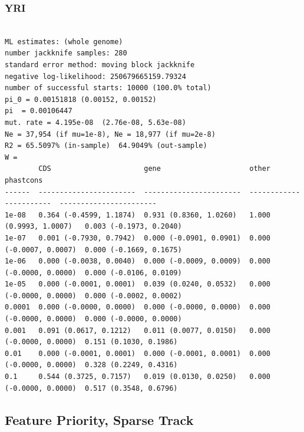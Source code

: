 \documentclass[11pt]{article}
\begin{document}
\subsubsection*{YRI}
\begin{minipage}{\linewidth}\begin{footnotesize}
\begin{verbatim}

ML estimates: (whole genome)
number jackknife samples: 280
standard error method: moving block jackknife
negative log-likelihood: 250679665159.79324
number of successful starts: 10000 (100.0% total)
pi_0 = 0.00151818 (0.00152, 0.00152)
pi  = 0.00106447
mut. rate = 4.195e-08  (2.76e-08, 5.63e-08)
Ne = 37,954 (if mu=1e-8), Ne = 18,977 (if mu=2e-8)
R2 = 65.5097% (in-sample)  64.9049% (out-sample)
W = 
        CDS                      gene                     other                    phastcons
------  -----------------------  -----------------------  -----------------------  -----------------------
1e-08   0.364 (-0.4599, 1.1874)  0.931 (0.8360, 1.0260)   1.000 (0.9993, 1.0007)   0.003 (-0.1973, 0.2040)
1e-07   0.001 (-0.7930, 0.7942)  0.000 (-0.0901, 0.0901)  0.000 (-0.0007, 0.0007)  0.000 (-0.1669, 0.1675)
1e-06   0.000 (-0.0038, 0.0040)  0.000 (-0.0009, 0.0009)  0.000 (-0.0000, 0.0000)  0.000 (-0.0106, 0.0109)
1e-05   0.000 (-0.0001, 0.0001)  0.039 (0.0240, 0.0532)   0.000 (-0.0000, 0.0000)  0.000 (-0.0002, 0.0002)
0.0001  0.000 (-0.0000, 0.0000)  0.000 (-0.0000, 0.0000)  0.000 (-0.0000, 0.0000)  0.000 (-0.0000, 0.0000)
0.001   0.091 (0.0617, 0.1212)   0.011 (0.0077, 0.0150)   0.000 (-0.0000, 0.0000)  0.151 (0.1030, 0.1986)
0.01    0.000 (-0.0001, 0.0001)  0.000 (-0.0001, 0.0001)  0.000 (-0.0000, 0.0000)  0.328 (0.2249, 0.4316)
0.1     0.544 (0.3725, 0.7157)   0.019 (0.0130, 0.0250)   0.000 (-0.0000, 0.0000)  0.517 (0.3548, 0.6796)
\end{verbatim}
\end{footnotesize}\end{minipage}


\subsection{Feature Priority, Sparse Track}
\end{document}
